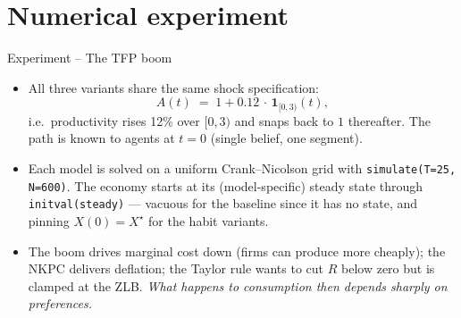 \documentclass[11pt,aspectratio=169]{beamer}
\begin{document}
\section{Numerical experiment}

\begin{frame}{Experiment -- The TFP boom}

\begin{itemize}

\item All three variants share the same shock specification:
  \[
  A(t) \;=\; 1 + 0.12\,\cdot\,\mathbf{1}_{[0,3)}(t),
  \]
  i.e.\ productivity rises 12\% over $[0, 3)$ and snaps back to
  $1$ thereafter. The path is known to agents at $t=0$ (single belief,
  one segment).\newline

\item Each model is solved on a uniform Crank--Nicolson grid with
  \texttt{simulate(T=25, N=600)}. The economy starts at its
  (model-specific) steady state through \texttt{initval(steady)} —
  vacuous for the baseline since it has no state, and pinning
  $X(0) = X^\star$ for the habit variants.\newline

\item The boom drives marginal cost down (firms can produce more
  cheaply); the NKPC delivers deflation; the Taylor rule wants to
  cut $R$ below zero but is clamped at the ZLB. \emph{What happens
  to consumption then depends sharply on preferences.}

\end{itemize}

\end{frame}
\end{document}
